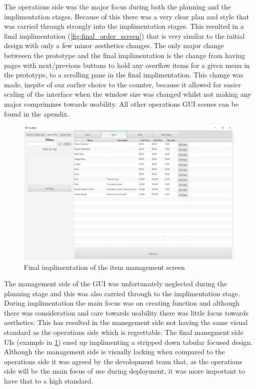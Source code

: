 The operations side was the major focus during both the planning and the implimentation stages. Because of this there was a very clear plan and style that was carried through strongly into the implimentation stages. This resulted in a final implimentation (\ref{fig:final_order_screen}) that is very similar to the initial design with only a few minor aesthetics changes. The only major change betweeen the prototype and the final implimentation is the change from having pages with next/previous buttons to hold any overflow items for a given menu in the prototype, to a scrolling pane in the final implimentation. This change was made, inspite of our earlier choice to the counter, because it allowed for easier scaling of the interface when the window size was changed whilst not making any major comprimizes towards usability.
All other operations GUI scenes can be found in the apendix.
\pagebreak

\begin{figure}[h]
	\centering
	\includegraphics[width=150mm]{images/Final_GUI/item_screen.png}
	\caption{Final implimentation of the item management screen}
	\label{fig:final_item_screen}
\end{figure}

The management side of the GUI was unfortunately neglected during the planning stage and this was also carried through to the implimentation stage. During implimentation the main focus was on creating function and although there was consideration and care towards usability there was little focus towards aesthetics. This has resulted in the manegement side not having the same visual standard as the operations side which is regrettable. The final manegment side UIs (example in \ref{fig:final_item_screen}) ened up implimenting a stripped down tabular focused design. Although the management side is visually lacking when compared to the operations side it was agreed by the devolopment team that, as the operations side will be the main focus of use during deployment, it was more important to have that to a high standard.

